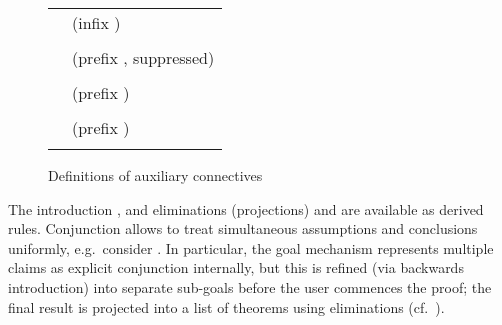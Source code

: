 \begin{isabellebody}
\begin{isamarkuptext}
  \begin{figure}[htb]
  \begin{center}
  \begin{tabular}{ll}
  \isa{conjunction\ {\isacharcolon}{\isacharcolon}\ prop\ {\isasymRightarrow}\ prop\ {\isasymRightarrow}\ prop} & (infix \isa{{\isacharampersand}{\isacharampersand}{\isacharampersand}}) \\
  \isa{{\isasymturnstile}\ A\ {\isacharampersand}{\isacharampersand}{\isacharampersand}\ B\ {\isasymequiv}\ {\isacharparenleft}{\isasymAnd}C{\isachardot}\ {\isacharparenleft}A\ {\isasymLongrightarrow}\ B\ {\isasymLongrightarrow}\ C{\isacharparenright}\ {\isasymLongrightarrow}\ C{\isacharparenright}} \\[1ex]
  \isa{prop\ {\isacharcolon}{\isacharcolon}\ prop\ {\isasymRightarrow}\ prop} & (prefix \isa{{\isacharhash}}, suppressed) \\
  \isa{{\isacharhash}A\ {\isasymequiv}\ A} \\[1ex]
  \isa{term\ {\isacharcolon}{\isacharcolon}\ {\isasymalpha}\ {\isasymRightarrow}\ prop} & (prefix \isa{TERM}) \\
  \isa{term\ x\ {\isasymequiv}\ {\isacharparenleft}{\isasymAnd}A{\isachardot}\ A\ {\isasymLongrightarrow}\ A{\isacharparenright}} \\[1ex]
  \isa{TYPE\ {\isacharcolon}{\isacharcolon}\ {\isasymalpha}\ itself} & (prefix \isa{TYPE}) \\
  \isa{{\isacharparenleft}unspecified{\isacharparenright}} \\
  \end{tabular}
  \caption{Definitions of auxiliary connectives}\label{fig:pure-aux}
  \end{center}
  \end{figure}

  The introduction , and eliminations
  (projections)  and  are
  available as derived rules.  Conjunction allows to treat
  simultaneous assumptions and conclusions uniformly, e.g.\ consider
  .  In particular, the goal mechanism
  represents multiple claims as explicit conjunction internally, but
  this is refined (via backwards introduction) into separate sub-goals
  before the user commences the proof; the final result is projected
  into a list of theorems using eliminations (cf.\
  ).


\end{isamarkuptext}
\end{isabellebody}
